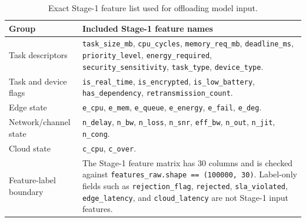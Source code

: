 \begin{table}[!t]
\centering
\caption{Exact Stage-1 feature list used for offloading model input.}
\label{tab:features}
\scriptsize
\begin{tabularx}{\textwidth}{@{}lX@{}}
\toprule
Group & Included Stage-1 feature names \\
\midrule
Task descriptors & \texttt{task\_size\_mb}, \texttt{cpu\_cycles}, \texttt{memory\_req\_mb}, \texttt{deadline\_ms}, \texttt{priority\_level}, \texttt{energy\_required}, \texttt{security\_sensitivity}, \texttt{task\_type}, \texttt{device\_type}. \\
Task and device flags & \texttt{is\_real\_time}, \texttt{is\_encrypted}, \texttt{is\_low\_battery}, \texttt{has\_dependency}, \texttt{retransmission\_count}. \\
Edge state & \texttt{e\_cpu}, \texttt{e\_mem}, \texttt{e\_queue}, \texttt{e\_energy}, \texttt{e\_fail}, \texttt{e\_deg}. \\
Network/channel state & \texttt{n\_delay}, \texttt{n\_bw}, \texttt{n\_loss}, \texttt{n\_snr}, \texttt{eff\_bw}, \texttt{n\_out}, \texttt{n\_jit}, \texttt{n\_cong}. \\
Cloud state & \texttt{c\_cpu}, \texttt{c\_over}. \\
Feature-label boundary & The Stage-1 feature matrix has 30 columns and is checked against \texttt{features\_raw.shape == (100000, 30)}. Label-only fields such as \texttt{rejection\_flag}, \texttt{rejected}, \texttt{sla\_violated}, \texttt{edge\_latency}, and \texttt{cloud\_latency} are not Stage-1 input features. \\
\bottomrule
\end{tabularx}
\end{table}
